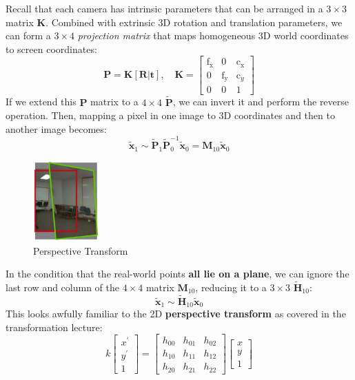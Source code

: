 \documentclass{article}
\let\vec\mathbf
\begin{document}
Recall that each camera has intrinsic parameters that can be arranged in a $3\times 3$ matrix $\vec{K}$.
Combined with extrinsic 3D rotation and translation parameters, we can form a $3\times 4$ \textit{projection matrix} that maps homogeneous 3D world coordinates to screen coordinates:
$$
\vec{P}=\vec{K}[\boldsymbol{R} | \vec{t}],\quad
\vec{K}= \left[ \begin{array}{lll}{\mathrm{f}_{\mathrm{x}}} & {0} & {\mathrm{c}_{\mathrm{x}}} \\ {0} & {\mathrm{f}_{\mathrm{y}}} & {\mathrm{c}_{y}} \\ {0} & {0} & {1}\end{array}\right]
$$
If we extend this $\vec{P}$ matrix to a $4\times 4$ $\tilde{\vec{P}}$, we can invert it and perform the reverse operation.
Then, mapping a pixel in one image to 3D coordinates and then to another image becomes:
$$ 
\tilde{\boldsymbol{x}}_{1} \sim \tilde{\boldsymbol{P}}_{1} \tilde{\boldsymbol{P}}_{0}^{-1} \tilde{\boldsymbol{x}}_{0}=\boldsymbol{M}_{10} \tilde{\boldsymbol{x}}_{0}
$$
\begin{figure}
  \vspace{-40pt}
  \begin{center}
    \includegraphics[width=0.225\textwidth]{perspective.png}
  \end{center}
  \vspace{-20pt}
  \caption{Perspective Transform}
  \vspace{-30pt}
\end{figure}
In the condition that the real-world points \textbf{all lie on a plane}, we can ignore the last row and column of the $4\times 4$ matrix $\boldsymbol{M}_{10}$, reducing it to a $3\times 3$ $\tilde{\boldsymbol{H}}_{10}$:
$$ 
\tilde{\boldsymbol{x}}_{1} \sim \tilde{\boldsymbol{H}}_{10} \tilde{\boldsymbol{x}}_{0}
$$
This looks awfully familiar to the 2D \textbf{perspective transform} as covered in the transformation lecture:
$$ 
k \left[ \begin{array}{l}{x^{\prime}} \\ {y^{\prime}} \\ {1}\end{array}\right]=\left[ \begin{array}{lll}{h_{00}} & {h_{01}} & {h_{02}} \\ {h_{10}} & {h_{11}} & {h_{12}} \\ {h_{20}} & {h_{21}} & {h_{22}}\end{array}\right] \left[ \begin{array}{l}{x} \\ {y} \\ {1}\end{array}\right]
$$
\end{document}
